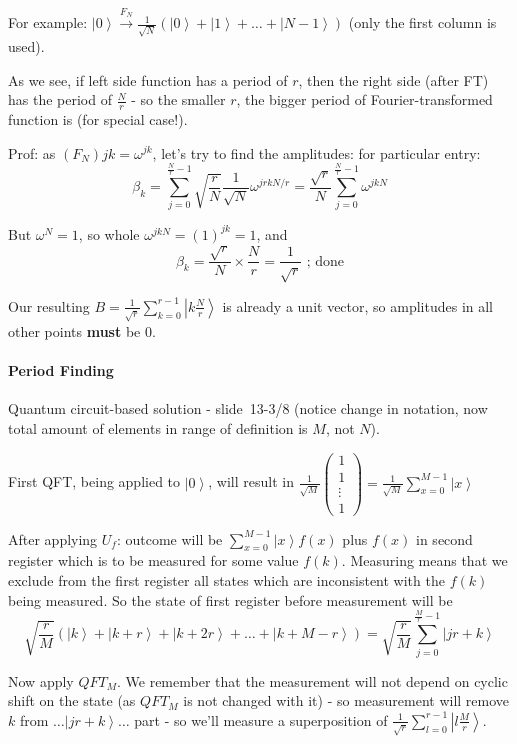 \documentclass{scrartcl}
\newcommand{\ket}[1]{\left| #1 \right>} %
\newcommand{\slide}[2]{slide~#1/#2} %
\begin{document}
\begin{itemize}
  For example: $\ket0 \xrightarrow{F_N} \frac1{\sqrt{N}}(\ket0 + \ket1 + \dots +
  \ket{N-1})$ (only the first column is used).

  As we see, if left side function has a period of $r$, then the right side
  (after FT) has the period of $\frac{N}r$ - so the smaller $r$, the bigger
  period of Fourier-transformed function is (for special case!).

  Prof: as $(F_N){jk} = \omega^{jk}$, let's try to find the amplitudes: for
  particular entry: $$\beta_k = \sum \limits_{j=0}^{\frac Nr - 1}\sqrt{\frac rN}
  \frac1{\sqrt N} \omega^{jrkN/r} = \frac{\sqrt r}N \sum \limits_{j=0}^{\frac Nr
    - 1} \omega^{jkN}$$

  But $\omega^N = 1$, so whole $\omega^{jkN} = (1)^{jk} = 1$, and
$$\beta_k = \frac{\sqrt r} N \times \frac Nr = \frac1{\sqrt r} \text{ ; done}$$

Our resulting $B = \frac1{\sqrt{r}}\sum \limits_{k=0}^{r-1} \ket{k\frac Nr}$ is
already a unit vector, so amplitudes in all other points {\bf must } be 0.
\end{itemize}

\paragraph{Period Finding}

Quantum circuit-based solution - \slide {13-3} 8 (notice change in notation, now
total amount of elements in range of definition is $M$, not $N$).

First QFT, being applied to $\ket0$, will result in $\frac1{\sqrt
  M} \begin{pmatrix} 1 \\ 1\\ \vdots \\ 1 \end{pmatrix} = \frac1{\sqrt M} \sum
\limits_{x=0}^{M-1} \ket x$

After applying $U_f$: outcome will be $\sum \limits_{x=0}^{M-1}\ket x f(x)$ plus
$f(x)$ in second register which is to be measured for some value $f(k)$.
Measuring means that we exclude from the first register all states which are
inconsistent with the $f(k)$ being measured. So the state of first register
before measurement will be
$$\sqrt{\frac rM}( \ket k + \ket{k+r}+ \ket{k+2r} + \dots +
\ket{k+ M - r}) = \sqrt{\frac rM}\sum\limits_{j=0}^{\frac Mr -1} \ket{jr + k} $$

Now apply $QFT_M$. We remember that the measurement will not depend on cyclic
shift on the state (as $QFT_M$ is not changed with it) - so measurement will
remove $k$ from $\dots \ket{jr + k} \dots$ part - so we'll measure a
superposition of $\frac1{\sqrt r} \sum\limits_{l=0}^{r-1}\ket{l \frac Mr}$.
\end{document}
